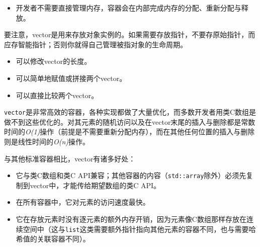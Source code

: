 
\begin{itemize}
\item 开发者不需要直接管理内存，容器会在内部完成内存的分配、重新分配与释放。

\end{itemize}



\begin{myNote}[tip]
要注意，vector是用来存放对象实例的。如果需要存放指针，不要存原始指针，而应存智能指针；否则你就得自己管理被指对象的生命周期。
\end{myNote}



\begin{itemize}
\item 可以修改vector的长度。



\item 可以简单地赋值或拼接两个vector。



\item 可以直接比较两个vector。

\end{itemize}



\texttt{vector}是非常高效的容器，各种实现都做了大量优化，而多数开发者用类C数组是做不到这些优化的。对其元素的随机访问以及在vector末尾的插入与删除都是常数时间的\textit{O(1)}操作（前提是不需要重新分配内存），而在其他任何位置的插入与删除则是线性时间的\textit{O(n)}操作。



与其他标准容器相比，vector有诸多好处：



\begin{itemize}
\item 它与类C数组和类C API兼容；其他容器的内容（\texttt{std::\allowbreak{}array}除外）必须先复制到vector中，才能传给期望数组的类C API。



\item 在所有容器中，它对元素的访问速度最快。



\item 它在存放元素时没有逐元素的额外内存开销，因为元素像C数组那样存放在连续空间中（这与\texttt{list}这类需要额外指针指向其他元素的容器不同，也与需要哈希值的关联容器不同）。

\end{itemize}


